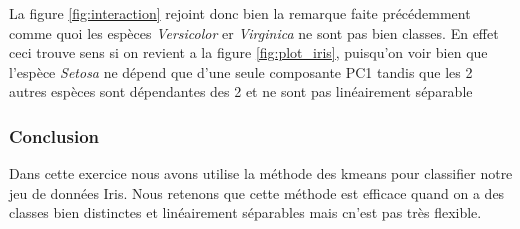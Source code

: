 \documentclass[10pt]{article}
\begin{document}
La figure \ref{fig:interaction} rejoint donc bien la remarque faite précédemment comme quoi les espèces \textit{Versicolor} er \textit{Virginica} ne sont pas bien classes. En effet ceci trouve sens si on revient a la figure \ref{fig:plot_iris}, puisqu'on voir bien que l'espèce \textit{Setosa} ne dépend que d'une seule composante PC1 tandis que les 2 autres espèces sont dépendantes des 2 et ne sont pas linéairement séparable
\subsubsection{Conclusion}
Dans cette exercice nous avons utilise la méthode des kmeans pour classifier notre jeu de données Iris. Nous retenons que cette méthode est efficace quand on a des classes bien distinctes et linéairement séparables mais cn'est pas très flexible.
\end{document}
